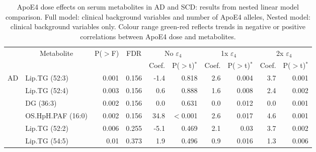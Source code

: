 \documentclass{amsart}
\begin{document}
\begin{table}[H]
\caption{ApoE4 dose effects on serum metabolites in AD and SCD: results from nested linear model comparison. Full model: clinical background variables and number of ApoE4 alleles, Nested model: clinical background variables only. Colour range green-red reflects trends in negative or positive correlations between ApoE4 dose and metabolites.}
\label{tab:nested}
\centering
\begin{threeparttable}
  \begin{tabular}{clrrrrrrrr} \toprule
    \multicolumn{1}{l}{} & \multicolumn{1}{c}{\multirow{2}{*}{Metabolite}} & \multicolumn{1}{c}{\multirow{2}{*}{P($>$F)}} & \multicolumn{1}{c}{\multirow{2}{*}{FDR}} & \multicolumn{2}{c}{No $\varepsilon_4$} & \multicolumn{2}{c}{1x $\varepsilon_4$} & \multicolumn{2}{c}{2x $\varepsilon_4$} \\
\multicolumn{1}{l}{} & \multicolumn{1}{c}{} & \multicolumn{1}{c}{} & \multicolumn{1}{c}{} & \multicolumn{1}{l}{Coef.} & \multicolumn{1}{l}{P($>$t)$^\ast$} & \multicolumn{1}{l}{Coef.} & \multicolumn{1}{l}{P($>$t)$^\ast$} & \multicolumn{1}{l}{Coef.} & \multicolumn{1}{l}{P($>$t)$^\ast$} \\ \midrule
  \multirow{19}{*}{AD} & Lip.TG (52:3) & 0.001 & 0.156 & {\cellcolor[rgb]{0.98,0.8,0.808}}-1.4 & 0.818 & {\cellcolor[rgb]{0.949,0.973,0.969}}2.6 & 0.004 & {\cellcolor[rgb]{0.929,0.965,0.949}}3.7 & 0.001 \\
   & Lip.TG (52:4) & 0.003 & 0.156 & {\cellcolor[rgb]{0.984,0.988,0.996}}0.6 & 0.888 & {\cellcolor[rgb]{0.969,0.98,0.98}}1.6 & 0.008 & {\cellcolor[rgb]{0.953,0.976,0.973}}2.4 & 0.002 \\
   & DG (36:3) & 0.002 & 0.156 & {\cellcolor[rgb]{0.984,0.957,0.969}}0.0 & 0.631 & {\cellcolor[rgb]{0.984,0.957,0.965}}0.0 & 0.012 & {\cellcolor[rgb]{0.984,0.957,0.969}}0.0 & 0.001 \\
   & OS.HpH.PAF (16:0) & 0.002 & 0.156 & {\cellcolor[rgb]{0.388,0.745,0.482}}34.8 & $<$0.001 & {\cellcolor[rgb]{0.949,0.973,0.969}}2.6 & 0.017 & {\cellcolor[rgb]{0.914,0.961,0.937}}4.6 & 0.001 \\
   & Lip.TG (52:2) & 0.006 & 0.255 & {\cellcolor[rgb]{0.973,0.412,0.42}}-5.1 & 0.469 & {\cellcolor[rgb]{0.957,0.976,0.976}}2.1 & 0.03 & {\cellcolor[rgb]{0.929,0.965,0.949}}3.7 & 0.002 \\
   & Lip.TG (54:5) & 0.01 & 0.373 & {\cellcolor[rgb]{0.965,0.98,0.98}}1.9 & 0.496 & {\cellcolor[rgb]{0.98,0.984,0.992}}0.9 & 0.016 & {\cellcolor[rgb]{0.973,0.984,0.988}}1.3 & 0.006 \\

\end{tabular}
\end{threeparttable}
\end{table}
\end{document}
